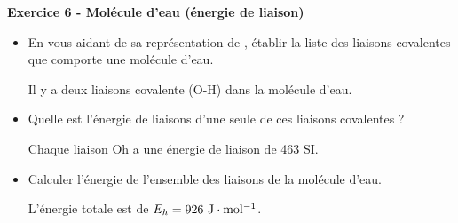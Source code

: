 \documentclass[french, a4paper, 12pt]{article}
\newcommand{\exo}[3]{
	\begin{mdframed}[style=exo, leftmargin=0pt, rightmargin=0pt, innertopmargin=8pt, innerbottommargin=8pt, innerrightmargin=10pt, innerleftmargin=10pt]

		\noindent \textbf{Exercice #1 - #2}\medskip

		#3
	\end{mdframed}
}
\begin{document}
\exo{6}{Molécule d'eau (énergie de liaison)}{

\begin{itemize}
	\item En vous aidant de sa représentation de \bsc{Lewis}, établir la liste des liaisons covalentes que comporte une molécule d'eau.\medskip
	

	
	Il y a deux liaisons covalente (O-H) dans la molécule d'eau.

	\item Quelle est l'énergie de liaisons d'une seule de ces liaisons covalentes ?\medskip
	


	Chaque liaison Oh a une énergie de liaison de 463 SI. 

	\item Calculer l'énergie de l'ensemble des liaisons de la molécule d'eau.\medskip
	
	L'énergie totale est de $E_h = 926 ~\rm J\cdot mol^{-1}$.
\end{itemize}
}
\end{document}

